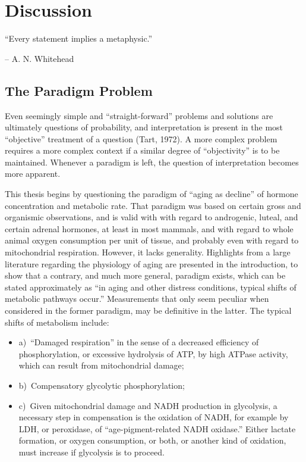 \chapter{Discussion}

\epigraph{\centering ``Every statement implies a metaphysic.''}{-- A. N. Whitehead}

\section{The Paradigm Problem}

Even seemingly simple and ``straight-forward'' problems and solutions are ultimately questions of probability, and interpretation is present in the most ``objective'' treatment of a question (Tart, 1972). A more complex problem requires a more complex context if a similar degree of ``objectivity'' is to be maintained. Whenever a paradigm is left, the question of interpretation becomes more apparent.

This thesis begins by questioning the paradigm of ``aging as decline'' of hormone concentration and metabolic rate. That paradigm was based on certain gross and organismic observations, and is valid with with regard to androgenic, luteal, and certain adrenal hormones, at least in most mammals, and with regard to whole animal oxygen consumption per unit of tissue, and probably even with regard to mitochondrial respiration. However, it lacks generality. Highlights from a large literature regarding the physiology of aging are presented in the introduction, to show that a contrary, and much more general, paradigm exists, which can be stated approximately as ``in aging and other distress conditions, typical shifts of metabolic pathways occur.'' Measurements that only seem peculiar when considered in the former paradigm, may be definitive in the latter. The typical shifts of metabolism include:

\begin{center}
\begin{adjustwidth}{0.1\linewidth}{0.1\linewidth}
\begin{itemize}[label={}, leftmargin=*, rightmargin=0pt]
    \item a)~``Damaged respiration'' in the sense of a decreased efficiency of phosphorylation, or excessive hydrolysis of ATP, by high ATPase activity, which can result from mitochondrial damage;
    \item b)~Compensatory glycolytic phosphorylation;
    \item c)~Given mitochondrial damage and NADH production in glycolysis, a necessary step in compensation is the oxidation of NADH, for example by LDH, or peroxidase, of ``age-pigment-related NADH oxidase.'' Either lactate formation, or oxygen consumption, or both, or another kind of oxidation, must increase if glycolysis is to proceed.
\end{itemize}
\end{adjustwidth}
\end{center}

